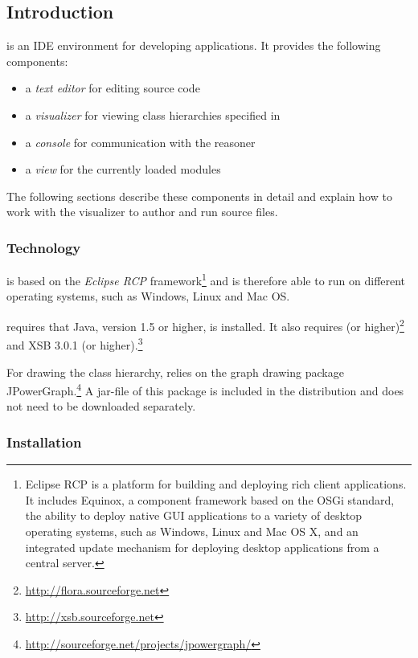 \subsection{Introduction}
\label{sec:introduction}

\FVIZ is an IDE environment for
developing \FLORA applications. It provides the following components:
\begin{itemize}
	\item a \emph{text editor} for editing \FLORA source code
	\item a \emph{visualizer} for viewing class hierarchies specified
          in \FLORA
	\item a \emph{console} for communication with the \FLORA reasoner
	\item a \emph{view} for the currently loaded modules
\end{itemize}

The following sections describe these components in detail and explain how
to work with the visualizer to author and run \FLORA source files.

\subsubsection{Technology}
\label{sec:introduction_technology}

\FVIZ is based on the \emph{Eclipse RCP} framework\footnote{
Eclipse RCP is a platform for building and deploying rich client applications.
It includes Equinox, a component framework based on the OSGi standard, the
ability to deploy native GUI applications to a variety of desktop operating
systems, such as Windows, Linux and Mac OS X, and an integrated update mechanism
for deploying desktop applications from a central server.\cite{erh}
  }
and is therefore able to
run on different operating systems, such as Windows, Linux and Mac OS.

\FVIZ requires that
Java, version 1.5 or higher, is installed. It also requires
 (or higher)\footnote{\url{http://flora.sourceforge.net}}
and XSB 3.0.1 (or higher).\footnote{\url{http://xsb.sourceforge.net}}

For drawing the class hierarchy, \FVIZ relies on the graph drawing package
JPowerGraph.\footnote{
  \url{http://sourceforge.net/projects/jpowergraph/}
}
A jar-file of this package is included in the distribution and does not
need to be downloaded separately.

\subsubsection{Installation}
\label{sec:introduction_installation}

